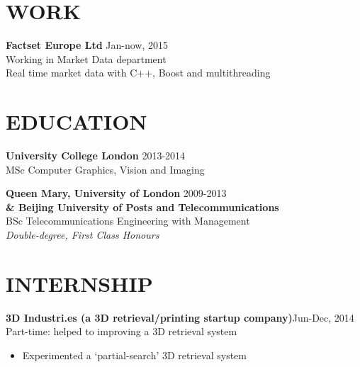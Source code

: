 \documentclass[line,margin]{res}
\begin{document}
\address{}
\address{}

\begin{resume}


\section{WORK}
{\bf Factset Europe Ltd}
\hfill{\textcolor[rgb]{0.7,0.7,0.7}{Jan-now, 2015}}\\
Working in Market Data department\\
Real time market data with C++, Boost and multithreading


\section{EDUCATION} 
{\bf University College London} \hfill{\textcolor[rgb]{0.7,0.7,0.7}{2013-2014}}\\
MSc Computer Graphics, Vision and Imaging

{\bf Queen Mary, University of London} \hfill{\textcolor[rgb]{0.7,0.7,0.7}{2009-2013}}\\
{\bf \& Beijing University of Posts and Telecommunications}\\
BSc Telecommunications Engineering with Management\\
\emph{Double-degree, First Class Honours}

\section{INTERNSHIP} 
\renewcommand{\labelitemi}{-}

{\bf 3D Industri.es (a 3D retrieval/printing startup company)}\hfill{\textcolor[rgb]{0.7,0.7,0.7}{Jun-Dec, 2014}}\\
Part-time: helped to improving a 3D retrieval system
\begin{itemize}\itemsep -2pt %
    \item Experimented a `partial-search' 3D retrieval system
\end{itemize}


\end{resume}
\end{document}
